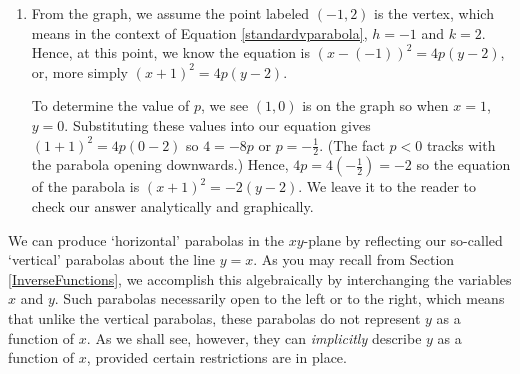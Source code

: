 \documentclass{ximera}
\begin{document}
\begin{example}
\begin{explanation}
\begin{enumerate}
\begin{image}
\end{image}


Since the focus is $(2,1)$, we know the the vertex lies on the vertical line $x=2$.  Moreover, since the vertex is halfway between the focus and directrix, we know the vertex is exactly $\frac{5}{2}$ units \textit{below} the focus at $\left(2,1-\frac{5}{2} \right) = \left(2, -\frac{3}{2} \right)$.  This gives $h=2$ and $k = -\frac{3}{2}$.  Since the focus of the parabola is $\frac{5}{2}$ units \textit{above} the vertex we know  $p = + \frac{5}{2}$.  Using  Equation \ref{standardvparabola}, we get our final answer:  $(x-2)^2 = 4 \left(\frac{5}{2}\right) \left(y - \left(- \frac{3}{2}\right) \right)^2$ or  $(x-2)^2 = 10 \left(y + \frac{3}{2}\right)^2$.



\item  From the graph, we assume the point labeled $(-1,2)$ is the vertex, which means in the context of  Equation \ref{standardvparabola}, $h = -1$ and $k = 2$.  Hence, at this point, we know the equation is $(x-(-1))^2 = 4p (y-2)$, or, more simply $(x+1)^2 = 4p(y-2)$.  


 

To determine the value of $p$, we see $(1,0)$ is on the graph so when $x = 1$, $y = 0$.  Substituting these values into our equation gives $(1+1)^2 = 4p(0-2)$ so $4=-8p$ or $p = -\frac{1}{2}$.  (The fact $p<0$ tracks with the parabola opening downwards.)  Hence, $4p = 4\left( -\frac{1}{2} \right) = -2$ so the equation of the parabola is  $(x+1)^2 = -2(y-2)$.  We leave it to the reader to check our answer analytically and graphically.  

\end{enumerate}
\end{explanation}
\end{example}

We can produce `horizontal' parabolas in the $xy$-plane by reflecting our so-called `vertical' parabolas about the line $y=x$.  As you may recall from Section \ref{InverseFunctions}, we accomplish this algebraically by interchanging the variables $x$ and $y$.  Such parabolas necessarily open to the left or to the right, which means that unlike the vertical parabolas, these parabolas do not represent $y$ as a function of $x$.   As we shall see, however, they can \textit{implicitly} describe $y$ as a function of $x$, provided certain restrictions are in place.
\end{document}
